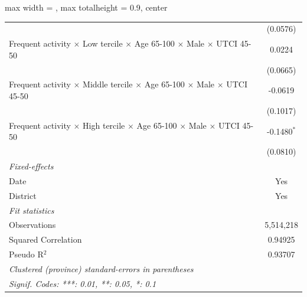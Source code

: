 \begin{table}[htbp]
\begin{adjustbox}{max width = \textwidth, max totalheight = 0.9\textheight, center}
\begin{tabular}{lc}
                                                                                                               & (0.0576)\\   
         Frequent activity $\times$ Low tercile $\times$ Age 65-100 $\times$ Male $\times$ UTCI 45-50          & 0.0224\\   
                                                                                                               & (0.0665)\\   
         Frequent activity $\times$ Middle tercile $\times$ Age 65-100 $\times$ Male $\times$ UTCI 45-50       & -0.0619\\   
                                                                                                               & (0.1017)\\   
         Frequent activity $\times$ High tercile $\times$ Age 65-100 $\times$ Male $\times$ UTCI 45-50         & -0.1480$^{*}$\\   
                                                                                                               & (0.0810)\\   
         \midrule
         \emph{Fixed-effects}\\
         Date                                                                                                  & Yes\\  
         District                                                                                              & Yes\\  
         \midrule
         \emph{Fit statistics}\\
         Observations                                                                                          & 5,514,218\\  
         Squared Correlation                                                                                   & 0.94925\\  
         Pseudo R$^2$                                                                                          & 0.93707\\  
         \midrule \midrule
         \multicolumn{2}{l}{\emph{Clustered (province) standard-errors in parentheses}}\\
         \multicolumn{2}{l}{\emph{Signif. Codes: ***: 0.01, **: 0.05, *: 0.1}}\\
      \end{tabular}
   \end{adjustbox}
\end{table}


